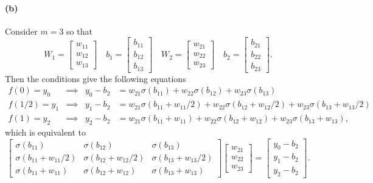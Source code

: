 \documentclass[12pt]{article}
\begin{document}
\paragraph{(b)}
Consider \(m=3\) so that
\[ W_1=\begin{bmatrix} w_{11} \\ w_{12} \\ w_{13} \end{bmatrix} \hspace{1em}
   b_1=\begin{bmatrix} b_{11} \\ b_{12} \\ b_{13} \end{bmatrix} \hspace{1em}
   W_2=\begin{bmatrix} w_{21} \\ w_{22} \\ w_{23} \end{bmatrix} \hspace{1em}
   b_2=\begin{bmatrix} b_{21} \\ b_{22} \\ b_{23} \end{bmatrix}. \]
Then the conditions give the following equations
\begin{align*}
    f(0)=y_0 &\implies& y_0 - b_2 &= w_{21}\sigma(b_{11}) + w_{22}\sigma(b_{12}) + w_{23}\sigma(b_{13}) \\
    f(1/2)=y_1 &\implies& y_1 - b_2 &= w_{21}\sigma(b_{11}+w_{11}/2) + w_{22}\sigma(b_{12}+w_{12}/2) + w_{23}\sigma(b_{13}+w_{13}/2) \\
    f(1)=y_2 &\implies& y_2 - b_2 &= w_{21}\sigma(b_{11}+w_{11}) + w_{22}\sigma(b_{12}+w_{12}) + w_{23}\sigma(b_{13}+w_{13}),
\end{align*}
which is equivalent to
\[ \begin{bmatrix} \sigma(b_{11}) & \sigma(b_{12}) & \sigma(b_{13}) \\
    \sigma(b_{11}+w_{11}/2) & \sigma(b_{12}+w_{12}/2) & \sigma(b_{13}+w_{13}/2) \\ 
    \sigma(b_{11}+w_{11}) & \sigma(b_{12}+w_{12}) & \sigma(b_{13}+w_{13}) \end{bmatrix}
    \begin{bmatrix} w_{21} \\ w_{22} \\ w_{23} \end{bmatrix} = 
    \begin{bmatrix} y_0-b_2 \\ y_1-b_2 \\ y_2-b_2 \end{bmatrix}. \]
\end{document}
